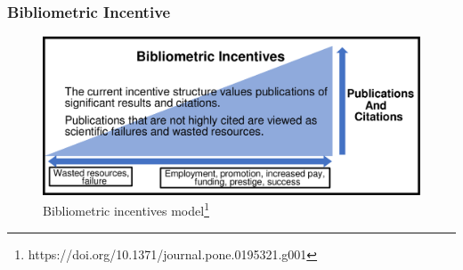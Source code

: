 \documentclass{beamer}
\begin{document}
\begin{frame}
    \frametitle{Bibliometric Incentive}

    \begin{figure}[h]
        \includegraphics[height=0.55\textheight]{bib_incentives.png}
        \caption{Bibliometric incentives model\footnote{https://doi.org/10.1371/journal.pone.0195321.g001}}
    \end{figure}

\end{frame}
\end{document}
